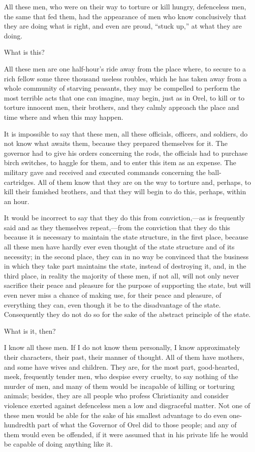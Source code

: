 \documentclass{book}
\begin{document}
All these men, who were on their way to torture or kill hungry, defenceless men, the same that fed them, had the appearance of men who know conclusively that they are doing what is right, and even are proud, “stuck up,” at what they are doing.

What is this?

All these men are one half-hour’s ride away from the place where, to secure to a rich fellow some three thousand useless roubles, which he has taken away from a whole community of starving peasants, they may be compelled to perform the most terrible acts that one can imagine, may begin, just as in Orel, to kill or to torture innocent men, their brothers, and they calmly approach the place and time where and when this may happen.

It is impossible to say that these men, all these officials, officers, and soldiers, do not know what awaits them, because they prepared themselves for it. The governor had to give his orders concerning the rods, the officials had to purchase birch switches, to haggle for them, and to enter this item as an expense. The military gave and received and executed commands concerning the ball-cartridges. All of them know that they are on the way to torture and, perhaps, to kill their famished brothers, and that they will begin to do this, perhaps, within an hour.

It would be incorrect to say that they do this from conviction,—as is frequently said and as they themselves repeat,—from the conviction that they do this because it is necessary to maintain the state structure, in the first place, because all these men have hardly ever even thought of the state structure and of its necessity; in the second place, they can in no way be convinced that the business in which they take part maintains the state, instead of destroying it, and, in the third place, in reality the majority of these men, if not all, will not only never sacrifice their peace and pleasure for the purpose of supporting the state, but will even never miss a chance of making use, for their peace and pleasure, of everything they can, even though it be to the disadvantage of the state. Consequently they do not do so for the sake of the abstract principle of the state.

What is it, then?

I know all these men. If I do not know them personally, I know approximately their characters, their past, their manner of thought. All of them have mothers, and some have wives and children. They are, for the most part, good-hearted, meek, frequently tender men, who despise every cruelty, to say nothing of the murder of men, and many of them would be incapable of killing or torturing animals; besides, they are all people who profess Christianity and consider violence exerted against defenceless men a low and disgraceful matter. Not one of these men would be able for the sake of his smallest advantage to do even one-hundredth part of what the Governor of Orel did to those people; and any of them would even be offended, if it were assumed that in his private life he would be capable of doing anything like it.
\end{document}
